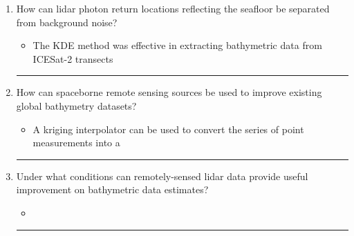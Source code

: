 \begin{enumerate}
\begin{itemize}
    \end{itemize}
    \rule{\paperwidth}{0.4pt}
    
    \item How can lidar photon return locations reflecting the seafloor be separated from background noise?
    
    \begin{itemize}
        \item The KDE method was effective in extracting bathymetric data from ICESat-2 transects
    \end{itemize}
    \rule{\paperwidth}{0.4pt}
    
    \item How can spaceborne remote sensing sources be used to improve existing global bathymetry datasets?
    \begin{itemize}
        \item A kriging interpolator can be used to convert the series of point measurements into a 
    \end{itemize}
    \rule{\paperwidth}{0.4pt}
    \item Under what conditions can remotely-sensed lidar data provide useful improvement on bathymetric data estimates?
    \begin{itemize}
        \item 
    \end{itemize}
    \rule{\paperwidth}{0.4pt}
\end{enumerate}